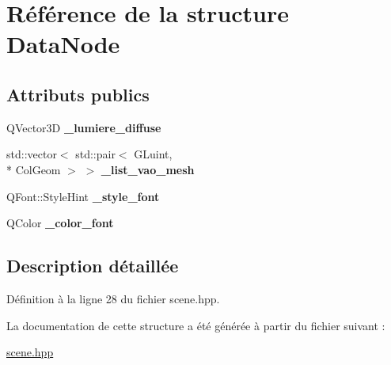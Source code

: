 \hypertarget{structDataNode}{\section{Référence de la structure Data\+Node}
\label{structDataNode}
}
\subsection*{Attributs publics}
\begin{DoxyCompactItemize}
\item 
\hypertarget{structDataNode_a99899d182e970cc844a0c6ab7e297b01}{Q\+Vector3\+D {\bfseries \+\_\+lumiere\+\_\+diffuse}}\label{structDataNode_a99899d182e970cc844a0c6ab7e297b01}

\item 
\hypertarget{structDataNode_aef89a41e0f53bc4201537c9603dbfa49}{std\+::vector$<$ std\+::pair$<$ G\+Luint, \\*
Col\+Geom $>$ $>$ {\bfseries \+\_\+list\+\_\+vao\+\_\+mesh}}\label{structDataNode_aef89a41e0f53bc4201537c9603dbfa49}

\item 
\hypertarget{structDataNode_a621d28bc18ab708e985e1c8e268ef096}{Q\+Font\+::\+Style\+Hint {\bfseries \+\_\+style\+\_\+font}}\label{structDataNode_a621d28bc18ab708e985e1c8e268ef096}

\item 
\hypertarget{structDataNode_aac4897ced26e415bb827583b196daeb1}{Q\+Color {\bfseries \+\_\+color\+\_\+font}}\label{structDataNode_aac4897ced26e415bb827583b196daeb1}

\end{DoxyCompactItemize}


\subsection{Description détaillée}


Définition à la ligne 28 du fichier scene.\+hpp.



La documentation de cette structure a été générée à partir du fichier suivant \+:\begin{DoxyCompactItemize}
\item 
\hyperlink{scene_8hpp}{scene.\+hpp}\end{DoxyCompactItemize}
